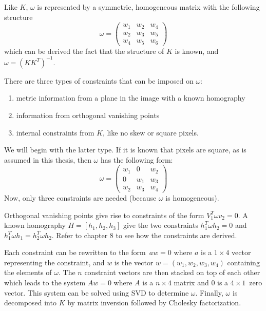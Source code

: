 Like $K$, $\omega$ is represented by a symmetric, homogeneous matrix with the following structure
$$
\omega = \begin{pmatrix}
	w_{1} & w_{2} & w_{4} \\
	w_{2} & w_{3} & w_{5} \\
	w_{4} & w_{5} & w_{6} 
\end{pmatrix}
$$
which can be derived the fact that the structure of $K$ is known, and $\omega = (KK^T)^{-1}$.

There are three types of constraints that can be imposed on $\omega$:
\begin{enumerate}
	\item metric information from a plane in the image with a known homography
	\item information from orthogonal vanishing points
	\item internal constraints from $K$, like no skew or square pixels.
\end{enumerate}

We will begin with the latter type.
If it is known that pixels are square, as is assumed in this thesis, then $\omega$ has the following form:
$$
\omega = \begin{pmatrix}
	w_{1} & 0 & w_{2} \\
	0 & w_{1} & w_{3} \\
	w_{2} & w_{3} & w_{4}
\end{pmatrix}
$$
Now, only three constraints are needed (because $\omega$ is homogeneous).

Orthogonal vanishing points give rise to constraints of the form $V_{1}^T \omega v_{2} = 0$.
A known homography $H=[h_{1},h_{2},h_{3}]$ give the two constraints $h_{1}^T \omega h_{2} = 0$ and $h_{1}^T \omega h_{1} = h_{2}^T \omega h_{2}$. Refer to \cite{hartley-zisserman} chapter 8 to see how the constraints are derived.

Each constraint can be rewritten to the form $aw=0$ where $a$ is a $1 \times 4$ vector representing the constraint, and $w$ is the vector $w = (w_1,w_2,w_3,w_4)$ containing the elements of $\omega$.
The $n$ constraint vectors are then stacked on top of each other which leads to the system $Aw=0$ where $A$ is a $n \times 4$ matrix and $0$ is a $4 \times 1$ zero vector. %
This system can be solved using SVD to determine $\omega$.
Finally, $\omega$ is decomposed into $K$ by matrix inversion followed by Cholesky factorization.\cite[223-226]{hartley-zisserman}

